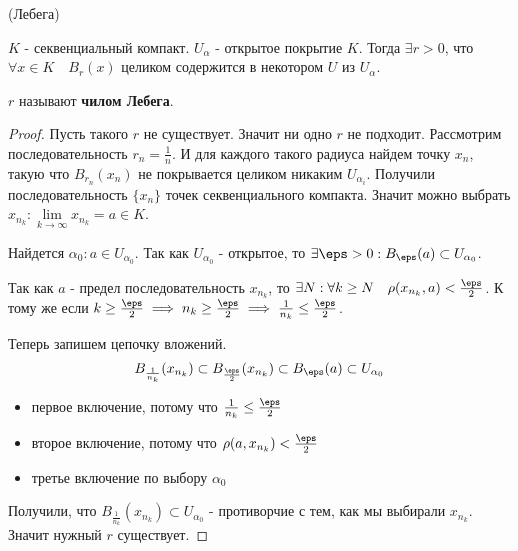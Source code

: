 
\begin{lemma}(Лебега) \thmslashn

$K$ - секвенциальный компакт. $U_{\alpha}$ - открытое покрытие $K$. Тогда $\exists r > 0$, что $\forall x \in K \quad B_r(x)$ целиком содержится в некотором $U$ из $U_{\alpha}$.
\par $r$ называют \textbf{чилом Лебега}.

  \begin{proof} \thmslashn
   
    Пусть такого $r$ не существует. Значит ни одно $r$ не подходит. Рассмотрим последовательность $r_n = \frac{1}{n}$. И для каждого такого радиуса найдем точку $x_n$, такую что
    $B_{r_n}(x_n)$ не покрывается целиком никаким $U_{\alpha_i}$. Получили последовательность $\{x_n\}$ точек секвенциального компакта. Значит можно выбрать $x_{n_k}: \lim\limits_{k\rightarrow\infty}{x_{n_k}} = a \in K$. \par
  Найдется $\alpha_0 : a \in U_{\alpha_0}$. Так как $U_{\alpha_0}$ - открытое, то $\exists \eps > 0: B_{\eps}(a) \subset U_{\alpha_0}$. \par
  Так как $a$ - предел последовательность $x_{n_k}$, то $\exists N : \forall k \ge N \quad  \rho(x_{n_k}, a) < \frac{\eps}{2}$. К тому же если $k \ge \frac{\eps}{2} \implies n_k \ge \frac{\eps}{2} \implies \frac{1}{n_k} \le \frac{\eps}{2}$. \par
  Теперь запишем цепочку вложений. 
  \[
    B_{\frac{1}{n_k}}(x_{n_k}) \subset B_{\frac{\eps}{2}}(x_{n_k}) \subset B_{\eps}(a) \subset U_{\alpha_0} 
  \]
  \begin{itemize}
    \item первое включение, потому что $\frac{1}{n_k} \le \frac{\eps}{2}$
    \item второе включение, потому что $\rho(a, x_{n_k}) < \frac{\eps}{2}$
    \item третье включение по выбору $\alpha_0$
  \end{itemize}

  Получили, что $B_{\frac{1}{n_k}}(x_{n_k}) \subset U_{\alpha_0}$ - противорчие с тем, как мы выбирали $x_{n_k}$. Значит нужный $r$ существует.

  \end{proof}

\end{lemma}

